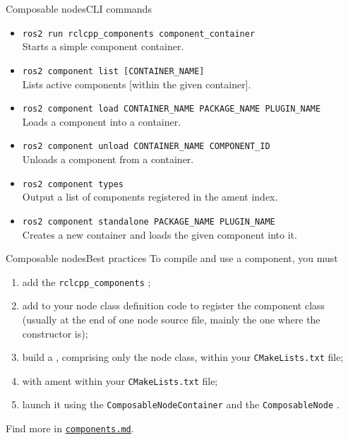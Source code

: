 \begin{frame}{Composable nodes}{CLI commands}
  \justifying
  \begin{itemize}
		\item \texttt{ros2 run rclcpp\_components component\_container}\\Starts a simple component container.
		\item \texttt{ros2 component list [CONTAINER\_NAME]}\\Lists active components [within the given container].
		\item \texttt{ros2 component load CONTAINER\_NAME PACKAGE\_NAME PLUGIN\_NAME}\\Loads a component into a container.
		\item \texttt{ros2 component unload CONTAINER\_NAME COMPONENT\_ID}\\Unloads a component from a container.
		\item \texttt{ros2 component types}\\Output a list of components registered in the ament index.
		\item \texttt{ros2 component standalone PACKAGE\_NAME PLUGIN\_NAME}\\Creates a new container and loads the given component into it.
	\end{itemize}
\end{frame}
\begin{frame}{Composable nodes}{Best practices}
  \justifying
  To compile and use a component, you must
  \begin{enumerate}
    \item add the \texttt{rclcpp\_components} ;
    \item add  to your node class definition code to register the component class (usually at the end of one node source file, mainly the one where the constructor is);
    \item build a , comprising only the node class, within your \texttt{CMakeLists.txt} file;
    \item {} with ament within your \texttt{CMakeLists.txt} file;
    \item launch it using the \texttt{ComposableNodeContainer}  and the \texttt{ComposableNode} .
  \end{enumerate}
  \bigskip
  \begin{block}{}
		\centering
		Find more in \href{https://github.com/IntelligentSystemsLabUTV/ros2-examples/blob/jazzy/components.md}{\color{blue}\underline{\texttt{components.md}}}.
	\end{block}
\end{frame}

